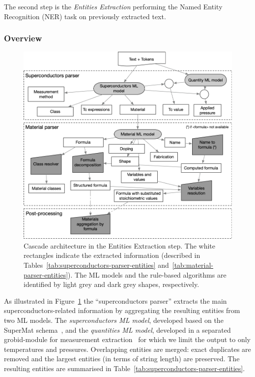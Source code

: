 \documentclass[]{interact}
\theoremstyle{plain}%
\theoremstyle{definition}
\theoremstyle{remark}
\begin{document}
The second step is the \textit{Entities Extraction} performing the Named Entity Recognition (NER) task on previously extracted text. 

\subsubsection*{Overview}

\begin{figure}[ht]
\includegraphics[width=\textwidth]{extraction-schema-4}
\caption{\label{fig:extraction-ml-models-cascade-architecture} Cascade architecture in the Entities Extraction step. The white rectangles indicate the extracted information (described in Tables~\ref{tab:superconductors-parser-entities} and~\ref{tab:material-parser-entities}). 
The ML models and the rule-based algorithms are identified by light grey and dark grey shapes, respectively.}
\end{figure}

As illustrated in Figure~\ref{fig:extraction-ml-models-cascade-architecture} the ``superconductors parser'' extracts the main superconductors-related information by aggregating the resulting entities from two ML models. 
The \textit{superconductors ML model}, developed based on the SuperMat schema~\cite{foppiano2021supermat}, and the \textit{quantities ML model}, developed in a separated grobid-module for measurement extraction~\cite{foppiano2019quantities} for which we limit the output to only temperatures and pressures.
Overlapping entities are merged: exact duplicates are removed and the largest entities (in terms of string length) are preserved.
The resulting entities are summarised in Table~\ref{tab:superconductors-parser-entities}.
\end{document}
